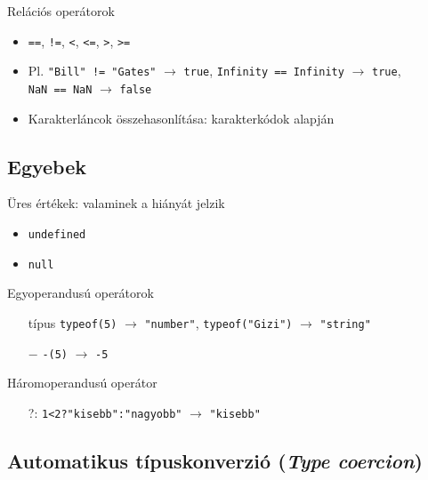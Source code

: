 \documentclass[usenames,dvipsnames,aspectratio=169]{beamer}
\begin{document}
\begin{frame}
    Relációs operátorok
    \begin{itemize}
        \item \texttt{==}, \texttt{!=}, \texttt{<}, \texttt{<=}, \texttt{>}, \texttt{>=} 
        \item Pl. \texttt{"Bill" != "Gates"} $\to$ \texttt{true}, \texttt{Infinity == Infinity} $\to$ \texttt{true}, \\  \texttt{NaN == NaN} $\to$ \texttt{false}
        \item Karakterláncok összehasonlítása: karakterkódok alapján
    \end{itemize}
\end{frame}

\subsection{Egyebek}

\begin{frame}
    Üres értékek: valaminek a hiányát jelzik
    \begin{itemize}
        \item \texttt{undefined}
        \item \texttt{null}
    \end{itemize}
    \vfill
    Egyoperandusú operátorok
    \begin{itemize}
        \item[típus] \texttt{typeof(5)} $\to$ \texttt{"number"}, \texttt{typeof("Gizi")} $\to$ \texttt{"string"}
        \item[$-$] \texttt{-(5)} $\to$ \texttt{-5}
    \end{itemize}
    \vfill
    Háromoperandusú operátor
    \begin{itemize}
        \item[?:] \texttt{1<2?"kisebb":"nagyobb"} $\to$ \texttt{"kisebb"}
    \end{itemize}
\end{frame}

\subsection{Automatikus típuskonverzió (\emph{Type coercion})}
\end{document}
